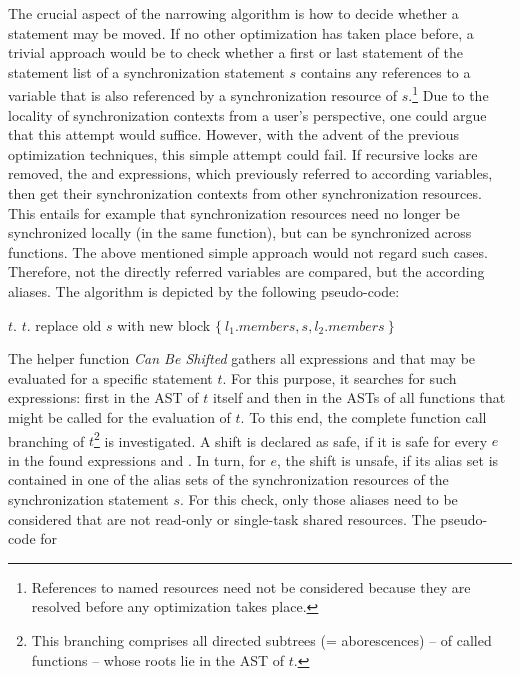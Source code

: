 The crucial aspect of the narrowing algorithm is how to decide whether a statement may be moved. If no other optimization has taken place before, a trivial approach would be to check whether a first or last statement of the statement list of a synchronization statement $s$ contains any references to a variable that is also referenced by a synchronization resource of $s$.\footnote{References to named resources need not be considered because they are resolved before any optimization takes place.} Due to the locality of synchronization contexts from a user's perspective, one could argue that this attempt would suffice. However, with the advent of the previous optimization techniques, this simple attempt could fail. If recursive locks are removed, the  and  expressions, which previously referred to according variables, then get their synchronization contexts from other synchronization resources. This entails for example that synchronization resources need no longer be synchronized locally (in the same function), but can be synchronized across functions. The above mentioned simple approach would not regard such cases. Therefore, not the directly referred variables are compared, but the according aliases. The algorithm is depicted by the following pseudo-code:
\begin{algorithmic}
\State {}
    \State $t$. 
  \EndWhile
    \State $t$. 
  \EndWhile
    \State replace old $s$ with new block $\{\ l_1.\textit{members}, s, l_2.\textit{members}\ \}$
  \EndIf
\EndFor
\EndFunction
\end{algorithmic}
The helper function \textit{Can Be Shifted} gathers all expressions  and  that may be evaluated for a specific statement $t$. For this purpose, it searches for such expressions: first in the AST of $t$ itself and then in the ASTs of all functions that might be called for the evaluation of $t$. To this end, the complete function call branching of $t$\footnote{This branching comprises all directed subtrees (= aborescences) -- of called functions -- whose roots lie in the AST of $t$.} is investigated. A shift is declared as safe, if it is safe for every $e$ in the found expressions  and . In turn, for $e$, the shift is unsafe, if its alias set is contained in one of the alias sets of the synchronization resources of the synchronization statement $s$. For this check, only those aliases need to be considered that are not read-only or single-task shared resources.  The pseudo-code for 
